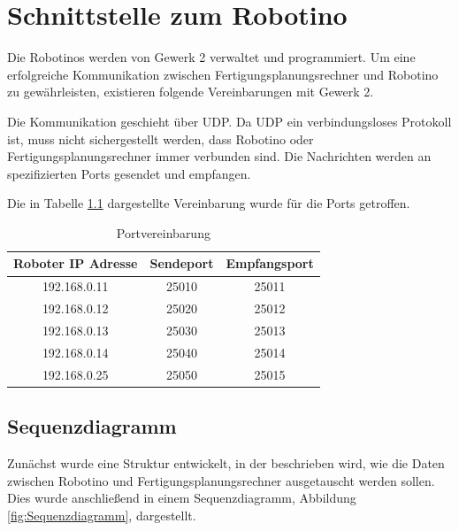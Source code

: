
\chapter{Schnittstelle zum Robotino}
\label{sec:Schnittstellen}

\label{sec:Gewerk2Protokoll}

Die Robotinos werden von Gewerk 2 verwaltet und programmiert. Um eine erfolgreiche Kommunikation zwischen Fertigungsplanungsrechner und Robotino zu gewährleisten, existieren folgende Vereinbarungen mit Gewerk 2.

Die Kommunikation geschieht über UDP. Da UDP ein verbindungsloses Protokoll ist, muss nicht sichergestellt werden, dass Robotino oder Fertigungsplanungsrechner immer verbunden sind. Die Nachrichten werden an spezifizierten Ports gesendet und empfangen.

Die in Tabelle \ref{tab:Ports} dargestellte Vereinbarung wurde für die Ports getroffen.

\begin{table}[!ht]
	\centering
	\begin{tabular}{|c|c|c|}
		\hline
		Roboter IP Adresse & Sendeport &	Empfangsport \\
		\hline
		192.168.0.11 & 25010 & 25011 \\
    192.168.0.12 & 25020 & 25012 \\
    192.168.0.13 & 25030 & 25013 \\
    192.168.0.14 & 25040 & 25014 \\
    192.168.0.25 & 25050 & 25015 \\
		\hline
	\end{tabular}
	\caption{Portvereinbarung}
	\label{tab:Ports}
\end{table}

\section{Sequenzdiagramm}
\label{sec:sequenzdiagram}

Zunächst wurde eine Struktur entwickelt, in der beschrieben wird, wie die Daten zwischen Robotino und Fertigungsplanungsrechner ausgetauscht werden sollen. Dies wurde anschließend in einem Sequenzdiagramm, Abbildung \ref{fig:Sequenzdiagramm}, dargestellt. 


